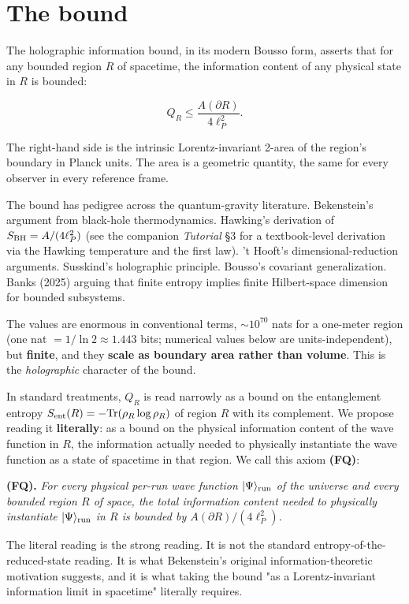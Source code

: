 \documentclass[11pt,a4paper]{article}
\newenvironment{qiqtquote}{\begin{mdframed}[style=quotestyle]}{\end{mdframed}}
\begin{document}
\section{The bound}

The holographic information bound, in its modern Bousso form, asserts that for any bounded region $R$ of spacetime, the information content of any physical state in $R$ is bounded:

\[
Q_R \le \frac{A(\partial R)}{4 \ell_P^2}.
\]

The right-hand side is the intrinsic Lorentz-invariant 2-area of the region's boundary in Planck units. The area is a geometric quantity, the same for every observer in every reference frame.

The bound has pedigree across the quantum-gravity literature. Bekenstein's argument from black-hole thermodynamics. Hawking's derivation of $S_{\rm BH} = A/(4\ell_P^2)$ (see the companion \emph{Tutorial} §3 for a textbook-level derivation via the Hawking temperature and the first law). 't Hooft's dimensional-reduction arguments. Susskind's holographic principle. Bousso's covariant generalization. Banks (2025) arguing that finite entropy implies finite Hilbert-space dimension for bounded subsystems.

The values are enormous in conventional terms, $\sim 10^{70}$ nats for a one-meter region (one nat $= 1/\ln 2 \approx 1.443$ bits; numerical values below are units-independent), but \textbf{finite}, and they \textbf{scale as boundary area rather than volume}. This is the \emph{holographic} character of the bound.

In standard treatments, $Q_R$ is read narrowly as a bound on the entanglement entropy $S_{\rm ent}(R) = -\mathrm{Tr}(\rho_R \log \rho_R)$ of region $R$ with its complement. We propose reading it \textbf{literally}: as a bound on the physical information content of the wave function in $R$, the information actually needed to physically instantiate the wave function as a state of spacetime in that region. We call this axiom \textbf{(FQ)}:

\begin{qiqtquote}
\textbf{(FQ).} \emph{For every physical per-run wave function $|\Psi\rangle_{\rm run}$ of the universe and every bounded region $R$ of space, the total information content needed to physically instantiate $|\Psi\rangle_{\rm run}$ in $R$ is bounded by $A(\partial R)/(4\ell_P^2)$.}
\end{qiqtquote}

The literal reading is the strong reading. It is not the standard entropy-of-the-reduced-state reading. It is what Bekenstein's original information-theoretic motivation suggests, and it is what taking the bound "as a Lorentz-invariant information limit in spacetime" literally requires.
\end{document}
